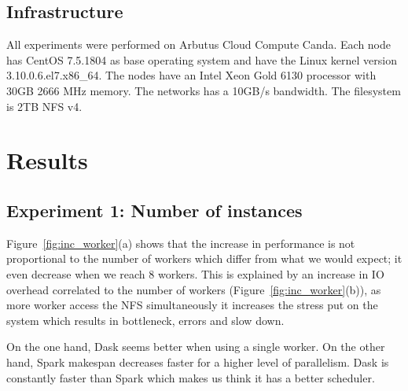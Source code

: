 \documentclass[conference]{IEEEtran}
\begin{document}
\subsection{Infrastructure}
All experiments were performed on Arbutus Cloud Compute Canda. Each node has CentOS
7.5.1804 as base operating system and have the Linux kernel version
3.10.0.6.el7.x86\_64. The nodes have an Intel Xeon Gold 6130 processor with
30GB 2666 MHz memory. The networks has a 10GB/s bandwidth. The filesystem is 2TB NFS v4.



\section{Results}

\subsection{Experiment 1: Number of instances}
Figure~\ref{fig:inc_worker}(a) shows that the increase in performance is not
proportional to the number of workers which differ from what we would expect; it even
decrease when we reach 8 workers. This is explained by an increase in IO overhead
correlated to the number of workers (Figure~\ref{fig:inc_worker}(b)), as more worker
access the NFS simultaneously it increases the stress put on the system which results
in bottleneck, errors and slow down.

On the one hand, Dask seems better when using a single worker. On the other hand,
Spark makespan decreases faster for a higher level of parallelism. Dask is constantly
faster than Spark which makes us think it has a better scheduler.
\end{document}
